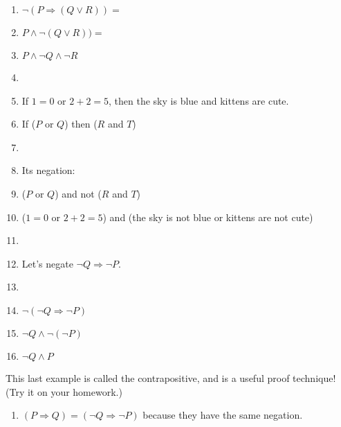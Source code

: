 \documentclass[12pt, reqno]{amsart}
\begin{document}
\begin{enumerate}
\item $\neg(P \Rightarrow (Q \vee R)) = $ 
\item [] $P \wedge \neg (Q \vee R)) = $ 
\item [] $P \wedge \neg Q \wedge \neg R$ 
\item []
\item If $1 = 0$ or $2 + 2 = 5$, then the sky is blue and kittens are cute.
\item [] If ($P$ or $Q$) then ($R$ and $T$)
\item [] 
\item [] Its negation:
\item [] ($P$ or $Q$) and not ($R$ and $T$)
\item [] ($1 = 0$ or $2 + 2  = 5$) and (the sky is not blue or kittens are not cute)
\item []
\item Let's negate $\neg Q \Rightarrow \neg P$.
\item []
\item [] $\neg (\neg Q \Rightarrow \neg P)$
\item [] $\neg Q \wedge \neg(\neg P)$
\item [] $\neg Q \wedge P$
\end{enumerate}

\vspace{10pt}

This last example is called the contrapositive, and is a useful proof technique! (Try it on your homework.)

\begin{enumerate}
\item $(P \Rightarrow Q) = (\neg Q \Rightarrow \neg P)$ because they have the same negation.
\end{enumerate}
\end{document}
